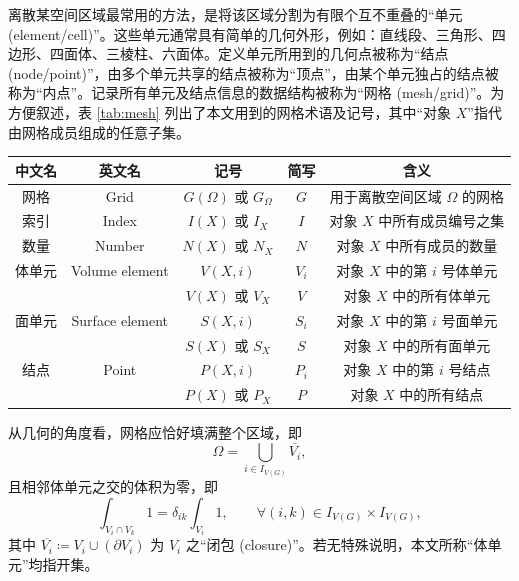 离散某空间区域最常用的方法，是将该区域分割为有限个互不重叠的“单元 (element/cell)”。这些单元通常具有简单的几何外形，例如：直线段、三角形、四边形、四面体、三棱柱、六面体。定义单元所用到的几何点被称为“结点
(node/point)”，由多个单元共享的结点被称为“顶点”，由某个单元独占的结点被称为“内点”。记录所有单元及结点信息的数据结构被称为“网格
(mesh/grid)”。为方便叙述，表 \ref{tab:mesh} 列出了本文用到的网格术语及记号，其中“对象 $X$”指代由网格成员组成的任意子集。
\begin{table}
\centering{}\caption{\label{tab:mesh}网格术语及记号}
\begin{longtable}[c]{ccccc}
\toprule 
中文名 & 英文名 & 记号 & 简写 & 含义\tabularnewline
\midrule
网格 & Grid & $G(\varOmega)$ 或 $G_{\varOmega}$\nomenclature{$G(\varOmega)$ 或 $G_{\varOmega}$}{表示覆盖区域 $\varOmega$ 的网格}  & $G$ & 用于离散空间区域 $\varOmega$ 的网格\tabularnewline
索引 & Index & $I(X)$ 或 $I_{X}$\nomenclature{$I(X)$ 或 $I_{X}$}{表示对象 $X$ 中所有成员编号之集} & $I$ & 对象 $X$ 中所有成员编号之集\tabularnewline
数量 & Number & $N(X)$ 或 $N_{X}$\nomenclature{$N(X)$ 或 $N_{X}$}{表示对象 $X$ 中所有成员的数量} & $N$ & 对象 $X$ 中所有成员的数量\tabularnewline
体单元 & Volume element & $V(X,i)$\nomenclature{$V(X,i)$ 或 $V_{i}$}{表示对象 $X$ 中的第 $i$ 号体单元} & $V_{i}$ & 对象 $X$ 中的第 $i$ 号体单元\tabularnewline
 &  & $V(X)$ 或 $V_{X}$\nomenclature{$V(X)$ 或 $V_{X}$}{表示对象 $X$ 中的所有体单元} & $V$ & 对象 $X$ 中的所有体单元\tabularnewline
面单元 & Surface element & $S(X,i)$\nomenclature{$S(X,i)$}{表示对象 $X$ 中的第 $i$ 号面单元} & $S_{i}$ & 对象 $X$ 中的第 $i$ 号面单元\tabularnewline
 &  & $S(X)$ 或 $S_{X}$\nomenclature{$S(X)$ 或 $S_{X}$}{表示对象 $X$ 中的所有面单元} & $S$ & 对象 $X$ 中的所有面单元\tabularnewline
结点 & Point & $P(X,i)$\nomenclature{$P(X,i)$}{表示对象 $X$ 中的第 $i$ 号结点} & $P_{i}$ & 对象 $X$ 中的第 $i$ 号结点\tabularnewline
 &  & $P(X)$ 或 $P_{X}$\nomenclature{$P(X)$ 或 $P_{X}$}{表示对象 $X$ 中的所有结点} & $P$ & 对象 $X$ 中的所有结点\tabularnewline
\bottomrule
\end{longtable}
\end{table}

从几何的角度看，网格应恰好填满整个区域，即
\begin{equation}
\varOmega=\bigcup_{i\in I_{V(G)}}\overline{V_{i}},
\end{equation}
且相邻体单元之交的体积为零，即
\begin{equation}
\int_{V_{i}\cap V_{k}}1=\delta_{ik}\int_{V_{i}}1,\qquad\forall(i,k)\in I_{V(G)}\times I_{V(G)},
\end{equation}
其中 $\overline{V_{i}}\coloneqq V_{i}\cup(\partial V_{i})$ 为 $V_{i}$
之“闭包 (closure)”。若无特殊说明，本文所称“体单元”均指开集。

